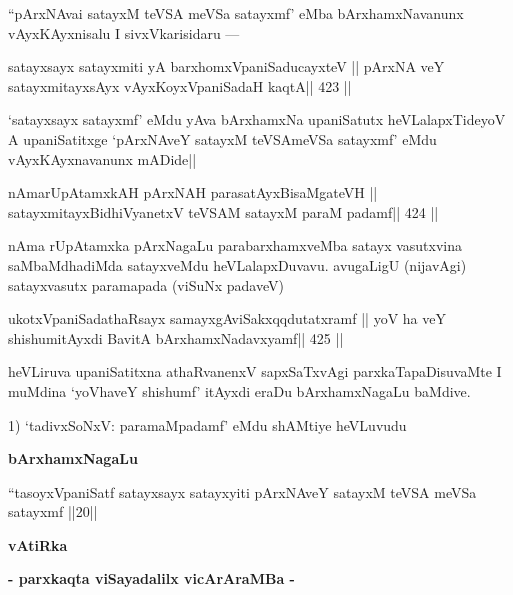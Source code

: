 \begin{artha}
``pArxNAvai satayxM teVSA meVSa satayxmf' eMba bArxhamxNavanunx
  vAyxKAyxnisalu I sivxVkarisidaru ---
\end{artha}

\begin{shl}
satayxsayx satayxmiti yA barxhomxVpaniSaducayxteV ||
pArxNA veY satayxmitayxsAyx vAyxKoyxVpaniSadaH kaqtA\hfill || 423 ||
\end{shl}

\begin{artha}
`satayxsayx satayxmf' eMdu yAva bArxhamxNa upaniSatutx
  heVLalapxTideyoV A upaniSatitxge `pArxNAveY satayxM teVSAmeVSa
  satayxmf' eMdu vAyxKAyxnavanunx mADide||
\end{artha}

\begin{shl}
nAmarUpAtamxkAH pArxNAH parasatAyxBisaMgateVH ||
satayxmitayxBidhiVyanetxV teVSAM satayxM paraM padamf\hfill || 424 ||
\end{shl}

\begin{artha}
nAma rUpAtamxka pArxNagaLu parabarxhamxveMba satayx vasutxvina
saMbaMdhadiMda satayxveMdu heVLalapxDuvavu. avugaLigU (nijavAgi)
satayxvasutx paramapada (viSuNx padaveV) 
\end{artha}

\begin{shl}
ukotxVpaniSadathaRsayx samayxgAviSakxqqdutatxramf ||
yoV ha veY shishumitAyxdi BavitA bArxhamxNadavxyamf\hfill || 425 ||
\end{shl}

\begin{artha}
heVLiruva upaniSatitxna athaRvanenxV sapxSaTxvAgi parxkaTapaDisuvaMte
I muMdina `yoVhaveY shishumf' itAyxdi eraDu bArxhamxNagaLu baMdive.
\end{artha}

\begin{artha}
1) `tadivxSoNxV: paramaMpadamf' eMdu shAMtiye heVLuvudu

\medskip
\centerline{\textbf{bArxhamxNagaLu}}

``tasoyxVpaniSatf satayxsayx satayxyiti pArxNAveY satayxM teVSA meVSa
satayxmf ||20||
\end{artha}

\begin{center}
{\LARGE{\textbf{vAtiRka}}}

\medskip

{\large{\textbf{- parxkaqta viSayadalilx vicArAraMBa -}}}
\end{center}


